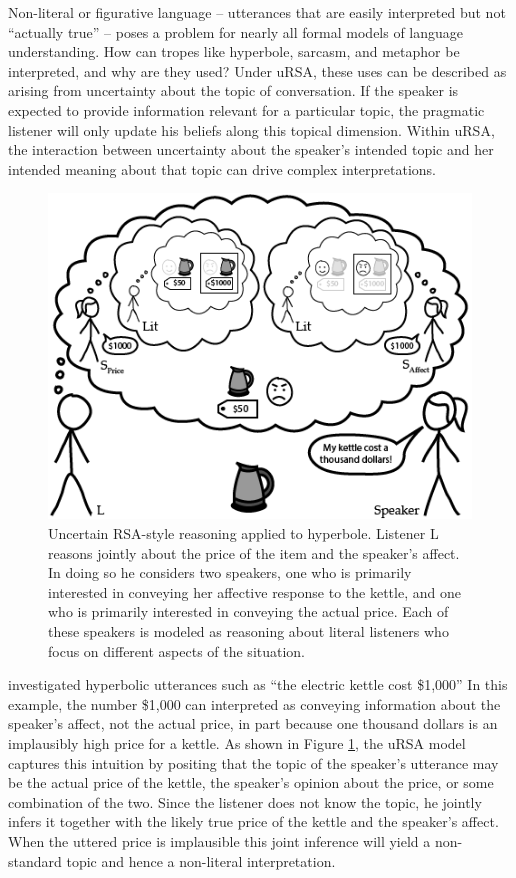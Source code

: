 \documentclass[]{elsarticle}
\begin{document}
Non-literal or figurative language -- utterances that are easily interpreted but not
``actually true'' -- poses a problem for nearly all formal models of language
understanding. How can tropes like
hyperbole, sarcasm, and metaphor be interpreted, and why are they used?
Under uRSA, these uses can be described as arising from uncertainty
about the topic of conversation. If the speaker is expected to provide
information relevant for a particular topic,
the pragmatic listener will only update his beliefs along this topical
dimension. Within uRSA, the interaction between uncertainty about the speaker's
intended topic and her intended meaning about that topic can drive
complex interpretations.

\begin{figure}[ht]
\begin{center}
\includegraphics[width=1.0\textwidth]{images/media/image03.png}
\caption{\label{fig:ursa} Uncertain RSA-style reasoning applied to hyperbole. Listener L reasons jointly about the price of the item and the speaker's affect. In doing so he considers two speakers, one who is primarily interested in conveying her affective response to the kettle, and one who is primarily interested in conveying the actual price. Each of these speakers is modeled as reasoning about literal listeners who focus on different aspects of the situation.}
\end{center}
\end{figure}

\citet{kao2014} investigated hyperbolic utterances such as ``the
electric kettle cost \$1,000'' In this example, the number \$1,000 can
interpreted as conveying information about the speaker's affect, not the
actual price, in part because one thousand dollars is an implausibly
high price for a kettle. As shown in Figure \ref{fig:ursa}, the uRSA model  captures this intuition by positing that the topic of the speaker's
utterance may be the actual price of the kettle, the speaker's
opinion about the price, or some combination of the two. Since the listener
does not know the topic, he jointly infers it together with the
likely true price of the kettle and the speaker's affect. When the
uttered price is implausible this joint inference will yield a
non-standard topic and hence a non-literal interpretation.
\end{document}
